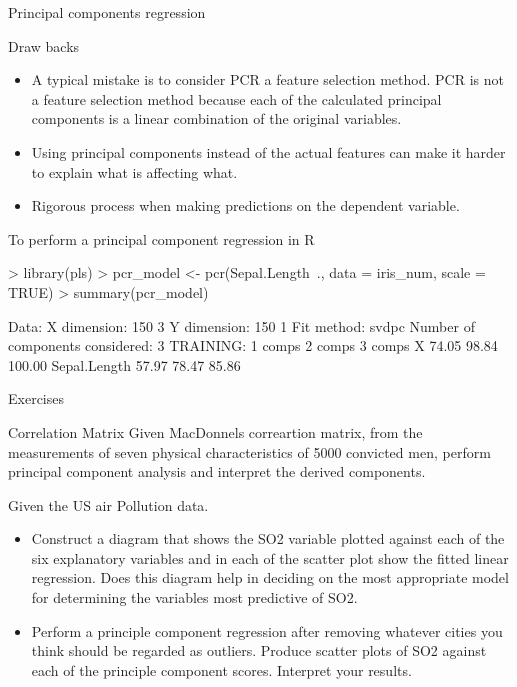 \documentclass[10pt]{beamer}
\begin{document}
\begin{frame}[fragile]{Principal components regression}
\begin{block}{Draw backs}
\begin{itemize}
\item A typical mistake is to consider PCR a feature selection method. PCR is not a feature selection method because each of the calculated principal components is a linear combination of the original variables.\\
\item Using principal components instead of the actual features can make it harder to explain what is affecting what.\\
\item Rigorous process when making predictions on the dependent variable.
\end{itemize}
\end{block}
To perform  a principal component regression in R
\begin{Schunk}
\begin{Sinput}
> library(pls)
> pcr_model <- pcr(Sepal.Length~., data = iris_num, scale = TRUE)
> summary(pcr_model)
\end{Sinput}
\begin{Soutput}
Data: 	X dimension: 150 3 
	Y dimension: 150 1
Fit method: svdpc
Number of components considered: 3
TRAINING: % variance explained
              1 comps  2 comps  3 comps
X               74.05    98.84   100.00
Sepal.Length    57.97    78.47    85.86
\end{Soutput}
\end{Schunk}

\end{frame}
\begin{frame}{Exercises}
\begin{block}{Correlation Matrix}
Given MacDonnels correartion matrix, from the measurements of seven physical characteristics of 5000 convicted men, perform principal component analysis and interpret the derived components.
\end{block}
Given the US air Pollution data.
\begin{itemize}
\item Construct a diagram that shows the SO2 variable plotted against each of the six explanatory variables and in each of the scatter plot show the fitted linear regression. Does this diagram help in deciding on the most appropriate model for determining the variables most predictive of SO2.
\item Perform a principle component regression after removing whatever cities you think should be regarded as outliers. Produce scatter plots of SO2 against each of the principle component scores. Interpret your results. 
\end{itemize}
\end{frame}
\end{document}
